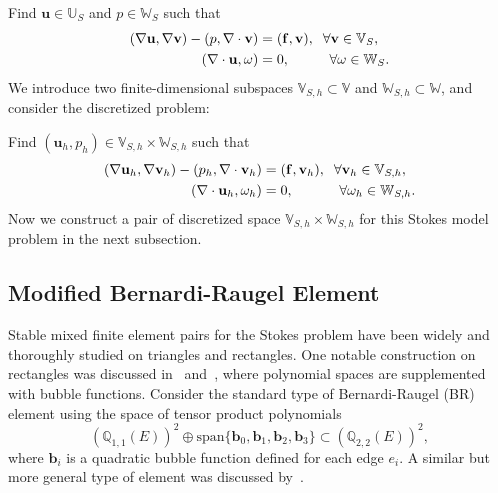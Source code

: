 Find $\mathbf{u} \in \mathbb{U}_S$  
and $p \in \mathbb{W}_S$ such that
\begin{equation}\label{eq:stokesweakmodel}
		  \begin{aligned}
					 (\nabla \mathbf{u}, \nabla\mathbf{v}) - (p, \nabla \cdot \mathbf{v}) &= (\mathbf{f},\mathbf{v}), \hspace{0.2cm} \forall \mathbf{v} \in \mathbb{V}_S,\\
					 (\nabla \cdot \mathbf{u}, \omega) &= 0, \hspace{1cm} \forall \omega \in \mathbb{W}_S.
		  \end{aligned}
\end{equation}
We introduce two finite-dimensional subspaces $\mathbb{V}_{S,h} \subset \mathbb{V}$ and $\mathbb{W}_{S,h} \subset \mathbb{W}$, and consider
the discretized problem: 

Find $(\mathbf{u}_h,p_h) \in \mathbb{V}_{S,h} \times \mathbb{W}_{S,h}$ such that
\begin{equation}\label{eq:stokesweakmodel_dis}
		  \begin{aligned}
					 (\nabla \mathbf{u}_h, \nabla \mathbf{v}_h) - (p_h, \nabla \cdot \mathbf{v}_h) &= (\mathbf{f},\mathbf{v}_h), \hspace{0.2cm} \forall \mathbf{v}_h \in \mathbb{V}_{S,h},\\
					 (\nabla \cdot \mathbf{u}_h, \omega_h) &= 0, \hspace{1.15cm} \forall \omega_h \in \mathbb{W}_{S,h}.
		  \end{aligned}
\end{equation}
Now we construct a pair of discretized space $\mathbb{V}_{S,h} \times \mathbb{W}_{S,h}$ for this Stokes model problem in the next subsection.

\subsection{Modified Bernardi-Raugel Element}
\label{sec:mbr}
Stable mixed finite element pairs for the Stokes problem have been widely and thoroughly studied on triangles and rectangles.
One notable construction on rectangles was discussed in~\cite{BRelement} and~\cite{Fortin1981OldAN},
where polynomial spaces are supplemented with bubble functions.
Consider the standard type of Bernardi-Raugel (BR) element using the space of tensor product
polynomials
\begin{equation}
(\mathbb{Q}_{1,1} (E))^2 \oplus \text{span}\{\mathbf{b}_0, \mathbf{b}_1, \mathbf{b}_2, \mathbf{b}_3 \} \subset (\mathbb{Q}_{2,2}(E))^2,
\end{equation}
where $\mathbf{b}_i$ is a quadratic bubble function defined for each edge $e_i$.
A similar but more general type of element was discussed by~\cite{doi:10.1137/S0036142903435247}.

